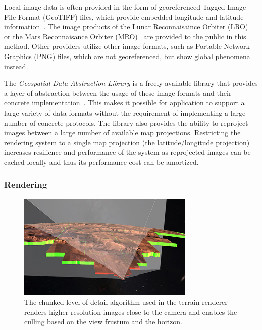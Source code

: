 Local image data is often provided in the form of georeferenced Tagged Image File Format (GeoTIFF) files, which provide embedded longitude and latitude information~\cite{ritter2000geotiff}.  The image products of the Lunar Reconnaisaince Orbiter (LRO)~\cite{vondrak2010lunar} or the Mars Reconnaisance Orbiter (MRO)~\cite{mcewen2016people} are provided to the public in this method.  Other providers utilize other image formats, such as Portable Network Graphics (PNG) files, which are not georeferenced, but show global phenomena instead.

The \emph{Geospatial Data Abstraction Library} is a freely available library that provides a layer of abstraction between the usage of these image formats and their concrete implementation~\cite{warmerdam2008geospatial}.  This makes it possible for application to support a large variety of data formats without the requirement of implementing a large number of concrete protocols.  The library also provides the ability to reproject images between a large number of available map projections.  Restricting the rendering system to a single map projection (the latitude/longitude projection) increases resilience and performance of the system as reprojected images can be cached locally and thus its performance cost can be amortized.


\subsubsection{Rendering} \label{contributions:astro:gb:rendering}
\begin{figure}
\centering
\includegraphics[width=0.75\textwidth]{figures/contributions/gb/culling.png}
\caption{The chunked level-of-detail algorithm used in the terrain renderer renders higher resolution images close to the camera and enables the culling based on the view frustum and the horizon.}
\label{contributions:astro:gb:culling}
\end{figure}

